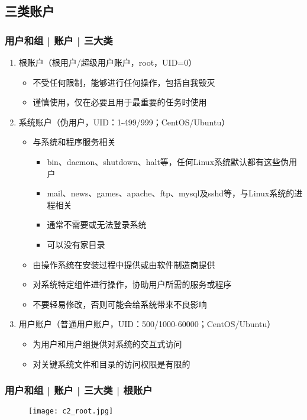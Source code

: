 \subsection{三类账户}
\begin{frame}
  \frametitle{用户和组 | 账户 | \alert{三大类}}
  \begin{enumerate}
    \item<1-> 根账户（根用户/超级用户账户，root，UID=0）
      \begin{itemize}
        \item<4-> 不受任何限制，能够进行任何操作，包括自我毁灭
        \item<5-> 谨慎使用，仅在必要且用于最重要的任务时使用
      \end{itemize}
    \item<2-> 系统账户（伪用户，UID：1-499/999；CentOS/Ubuntu）
      \begin{itemize}
        \item<6-> 与系统和程序服务相关
	  \begin{itemize}
	    \item bin、daemon、shutdown、halt等，任何Linux系统默认都有这些伪用户
	    \item mail、news、games、apache、ftp、mysql及sshd等，与Linux系统的进程相关
            \item 通常不需要或无法登录系统
            \item 可以没有家目录
	  \end{itemize}
        \item<6-> 由操作系统在安装过程中提供或由软件制造商提供
        \item<6-> 对系统特定组件进行操作，协助用户所需的服务或程序
        \item<7-> 不要轻易修改，否则可能会给系统带来不良影响
      \end{itemize}
    \item<3-> 用户账户（普通用户账户，UID：500/1000-60000；CentOS/Ubuntu）
      \begin{itemize}
        \item<8-> 为用户和用户组提供对系统的交互式访问
        \item<8-> 对关键系统文件和目录的访问权限是有限的
      \end{itemize}
  \end{enumerate}
\end{frame}

\begin{frame}
  \frametitle{用户和组 | 账户 | 三大类 | 根账户}
  \begin{figure}
    \centering
    \texttt{[image: c2\_root.jpg]}
  \end{figure}
\end{frame}

